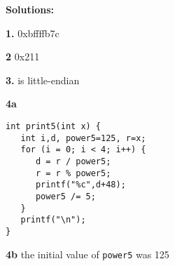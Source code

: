\documentclass[twocolumn]{article}
\begin{document}
{\bf Solutions:}

{\bf 1.}  0xbffffb7c 

{\bf 2 }  0x211

{\bf 3.} is little-endian

{\bf 4a}

\begin{Verbatim}[fontsize=\relsize{-2}]
int print5(int x) {
   int i,d, power5=125, r=x;
   for (i = 0; i < 4; i++) {
      d = r / power5;
      r = r % power5;
      printf("%c",d+48);
      power5 /= 5;
   }
   printf("\n");
}
\end{Verbatim}

{\bf 4b} the initial value of {\tt power5} was 125
\end{document}
